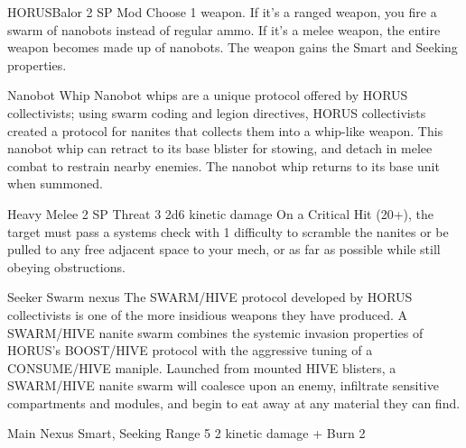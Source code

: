 \begin{mech}{HORUS}{Balor}
2 SP
Mod
Choose 1 weapon. If it’s a ranged weapon, you fire a swarm of nanobots instead of regular ammo. If it’s a melee weapon, the entire weapon becomes made up of nanobots. The weapon gains the Smart and Seeking properties.

Nanobot Whip
Nanobot whips are a unique protocol offered by HORUS collectivists; using swarm coding and legion directives, HORUS collectivists created a protocol for nanites that collects them into a whip-like weapon. This nanobot whip can retract to its base blister for stowing, and detach in melee combat to restrain nearby enemies. The nanobot whip returns to its base unit when summoned.

Heavy Melee
2 SP
Threat 3
2d6 kinetic damage
On a Critical Hit (20+), the target must pass a systems check with 1 difficulty to scramble the nanites or be pulled to any free adjacent space to your mech, or as far as possible while still obeying obstructions.

Seeker Swarm nexus
The SWARM/HIVE protocol developed by HORUS collectivists is one of the more insidious weapons they have produced. A SWARM/HIVE nanite swarm combines the systemic invasion properties of HORUS’s BOOST/HIVE protocol with the aggressive tuning of a CONSUME/HIVE maniple. Launched from mounted HIVE blisters, a SWARM/HIVE nanite swarm will coalesce upon an enemy, infiltrate sensitive compartments and modules, and begin to eat away at any material they can find.

Main Nexus
Smart, Seeking
Range 5
2 kinetic damage + Burn 2


\end{mech}
